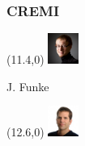\documentclass[aspectratio=169,table]{beamer}
\begin{document}
\begin{frame}
    \frametitle{CREMI}


    \begin{textblock}{3}(11.4,0)
        \tiny\includegraphics[width=1cm]{fig/people/funke.png}
        
        J. Funke%
    \end{textblock}%
    
    \begin{textblock}{3}(12.6,0)
        \tiny\includegraphics[width=1cm]{fig/people/bock.jpeg}
        

\end{textblock}
\end{frame}
\end{document}
